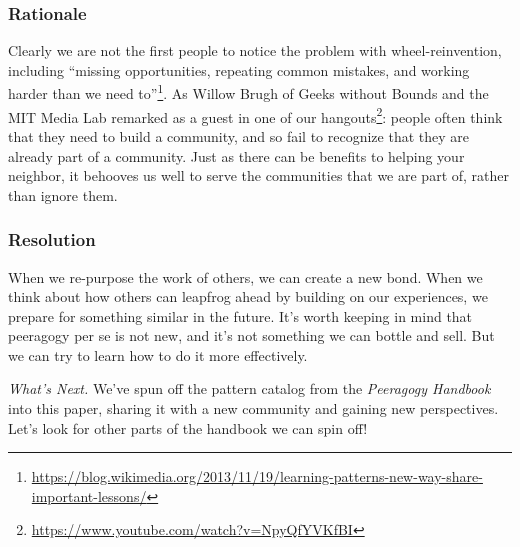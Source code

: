 \subsubsection*{Rationale} 
Clearly we are not the first people to notice the problem with wheel-reinvention, including ``missing opportunities, repeating common mistakes, and working harder than we need to''\footnote{\url{https://blog.wikimedia.org/2013/11/19/learning-patterns-new-way-share-important-lessons/}}.  As Willow Brugh of Geeks without Bounds and the MIT Media Lab remarked as a guest in one of our hangouts\footnote{\url{https://www.youtube.com/watch?v=NpyQfYVKfBI}}: people often think that they need to build a community, and so fail to recognize that they are already part of a community.  Just as there can be benefits to helping your neighbor, it behooves us well to serve the communities that we are part of, rather than ignore them.

\subsubsection*{Resolution} When we re-purpose the work of others, we can create a new bond.   When we think about how others can leapfrog ahead by building on our experiences, we prepare for something similar in the future.  It's worth keeping in mind that peeragogy per se is not new, and it's not something we can bottle and sell.  But we can try to learn how to do it more effectively.

\begin{framed}
\emph{What's Next.}
We've spun off the pattern catalog from the \emph{Peeragogy Handbook} into this paper, sharing it with a new community and gaining new perspectives.  Let's look for other parts of the handbook we can spin off!
\end{framed}

\endgroup
    
    
    
    
    
    